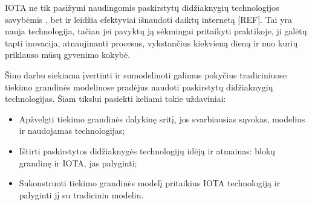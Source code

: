 IOTA ne tik pasižymi naudingomis paskirstytų didžiaknygių technologijos savybėmis \cite{bramas2018stability}, bet ir leidžia efektyviai išnaudoti daiktų internetą [REF]. Tai yra nauja technologija, tačiau jei pavyktų ją sėkmingai pritaikyti praktikoje, ji galėtų tapti inovacija, atnaujinanti procesus, vykstančius kiekvieną dieną ir nuo kurių priklauso mūsų gyvenimo kokybė.

 
Šiuo darbu siekiama įvertinti ir sumodeliuoti galimus pokyčius tradiciniuose tiekimo grandinės modeliuose pradėjus naudoti paskirstytų didžiaknygių technologijas.
Šiam tikslui pasiekti keliami tokie uždaviniai:


\begin{itemize}
    \item Apžvelgti tiekimo grandinės dalykinę sritį, jos svarbiausias sąvokas, modelius ir naudojamas technologijas;
    \item Ištirti paskirstytos didžiaknygės technologijų idėją ir atmainas: blokų grandinę ir IOTA, jas palyginti;
    \item Sukonstruoti tiekimo grandinės modelį pritaikius IOTA technologiją ir palyginti jį su tradiciniu modeliu.
\end{itemize}

